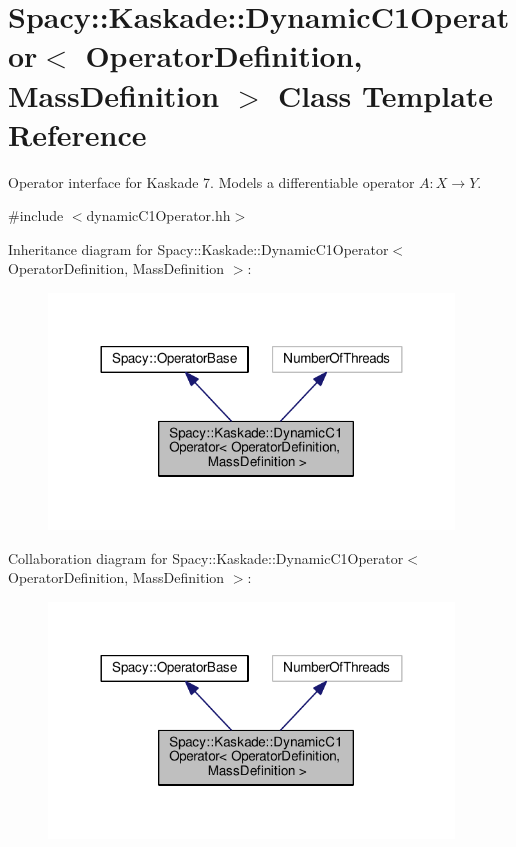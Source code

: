 \hypertarget{classSpacy_1_1Kaskade_1_1DynamicC1Operator}{\section{Spacy\-:\-:Kaskade\-:\-:Dynamic\-C1\-Operator$<$ Operator\-Definition, Mass\-Definition $>$ Class Template Reference}
\label{classSpacy_1_1Kaskade_1_1DynamicC1Operator}
}


Operator interface for Kaskade 7. Models a differentiable operator $A:X\rightarrow Y$.  




{\ttfamily \#include $<$dynamic\-C1\-Operator.\-hh$>$}



Inheritance diagram for Spacy\-:\-:Kaskade\-:\-:Dynamic\-C1\-Operator$<$ Operator\-Definition, Mass\-Definition $>$\-:
\nopagebreak
\begin{figure}[H]
\begin{center}
\leavevmode
\includegraphics[width=305pt]{classSpacy_1_1Kaskade_1_1DynamicC1Operator__inherit__graph}
\end{center}
\end{figure}


Collaboration diagram for Spacy\-:\-:Kaskade\-:\-:Dynamic\-C1\-Operator$<$ Operator\-Definition, Mass\-Definition $>$\-:
\nopagebreak
\begin{figure}[H]
\begin{center}
\leavevmode
\includegraphics[width=305pt]{classSpacy_1_1Kaskade_1_1DynamicC1Operator__coll__graph}
\end{center}
\end{figure}
